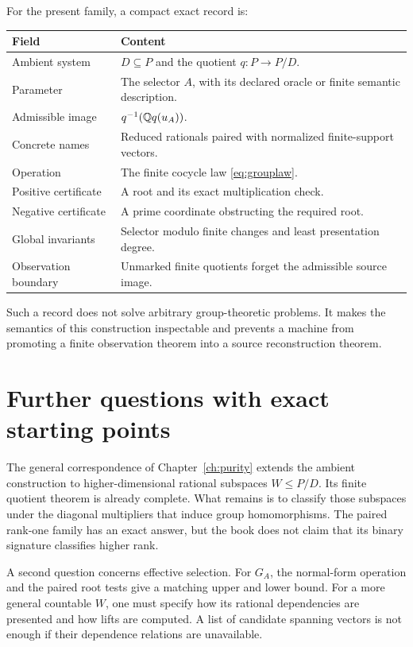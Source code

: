 For the present family, a compact exact record is:
\begin{center}
\begin{tabularx}{\textwidth}{@{}p{}X@{}}
\toprule
Field&Content\\\midrule
Ambient system&$D\subseteq P$ and the quotient $q:P\to P/D$.\\
Parameter&The selector $A$, with its declared oracle or finite semantic description.\\
Admissible image&$q^{-1}(\mathbb Q q(u_A))$.\\
Concrete names&Reduced rationals paired with normalized finite-support vectors.\\
Operation&The finite cocycle law \eqref{eq:grouplaw}.\\
Positive certificate&A root and its exact multiplication check.\\
Negative certificate&A prime coordinate obstructing the required root.\\
Global invariants&Selector modulo finite changes and least presentation degree.\\
Observation boundary&Unmarked finite quotients forget the admissible source image.\\\bottomrule
\end{tabularx}
\end{center}
Such a record does not solve arbitrary group-theoretic problems. It makes the semantics of this construction inspectable and prevents a machine from promoting a finite observation theorem into a source reconstruction theorem.

\section{Further questions with exact starting points}
The general correspondence of Chapter~\ref{ch:purity} extends the ambient construction to higher-dimensional rational subspaces $W\le P/D$. Its finite quotient theorem is already complete. What remains is to classify those subspaces under the diagonal multipliers that induce group homomorphisms. The paired rank-one family has an exact answer, but the book does not claim that its binary signature classifies higher rank.

A second question concerns effective selection. For $G_A$, the normal-form operation and the paired root tests give a matching upper and lower bound. For a more general countable $W$, one must specify how its rational dependencies are presented and how lifts are computed. A list of candidate spanning vectors is not enough if their dependence relations are unavailable.

